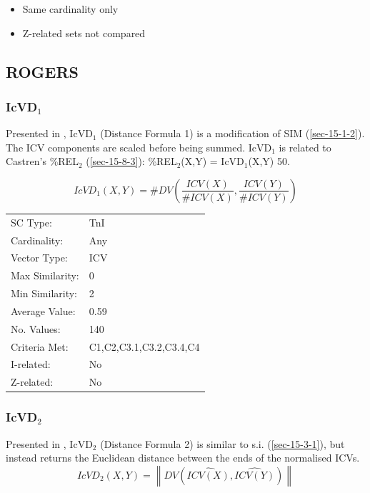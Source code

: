 \documentclass{article}
\begin{document}
\begin{itemize}
\item Same cardinality only
\item Z-related sets not compared
\end{itemize}
\subsection{ROGERS}
\label{sec-15-4}
\subsubsection{IcVD$_{1}$}
\label{sec-15-4-1}

Presented in \citet{Rogers1992}, IcVD$_{1}$ (Distance Formula 1) is a
modification of SIM (\ref{sec-15-1-2}). The ICV components are scaled before being
summed. IcVD$_{1}$ is related to Castren's \%REL$_{2}$ (\ref{sec-15-8-3}):
\%REL$_{2}$(X,Y) = IcVD$_{1}$(X,Y)\texttimes{} 50.  

$$IcVD_{1}(X,Y)=\#DV\left(\frac{ICV(X)}{\#ICV(X)},\frac{ICV(Y)}{\#ICV(Y)}\right)$$


\begin{center}
\begin{tabular}{ll}
 SC Type:         &  TnI                      \\
 Cardinality:     &  Any                      \\
 Vector Type:     &  ICV                      \\
 Max Similarity:  &  0                        \\
 Min Similarity:  &  2                        \\
 Average Value:   &  0.59                     \\
 No. Values:      &  140                      \\
 Criteria Met:    &  C1,C2,C3.1,C3.2,C3.4,C4  \\
 I-related:       &  No                       \\
 Z-related:       &  No                       \\
\end{tabular}
\end{center}
\subsubsection{IcVD$_{2}$}
\label{sec-15-4-2}

Presented in \citet{Rogers1992}, IcVD$_{2}$ (Distance Formula 2) is
similar to s.i. (\ref{sec-15-3-1}), but instead returns the Euclidean distance
between the ends of the normalised ICVs.
$$IcVD_{2}(X,Y)=\left\|DV(\hat{ICV(X)},\hat{ICV(Y)})\right\|$$
\end{document}

